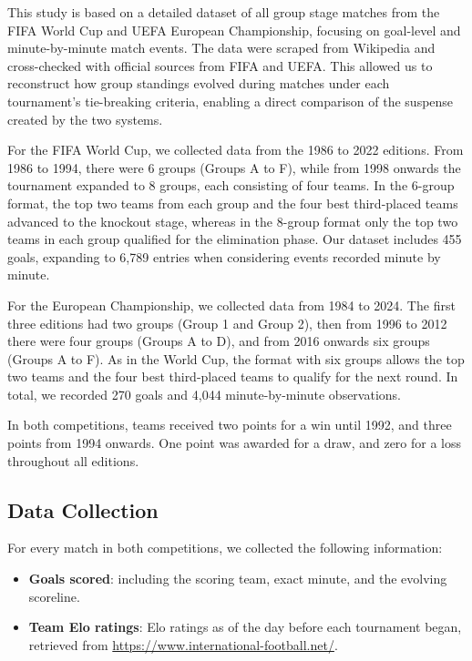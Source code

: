 \documentclass[11pt]{article}
\begin{document}
This study is based on a detailed dataset of all group stage matches from the FIFA World Cup and UEFA European Championship, focusing on goal-level and minute-by-minute match events. The data were scraped from Wikipedia and cross-checked with official sources from FIFA and UEFA. This allowed us to reconstruct how group standings evolved during matches under each tournament's tie-breaking criteria, enabling a direct comparison of the suspense created by the two systems.

For the FIFA World Cup, we collected data from the 1986 to 2022 editions. From 1986 to 1994, there were 6 groups (Groups A to F), while from 1998 onwards the tournament expanded to 8 groups, each consisting of four teams. In the 6-group format, the top two teams from each group and the four best third-placed teams advanced to the knockout stage, whereas in the 8-group format only the top two teams in each group qualified for the elimination phase. Our dataset includes 455 goals, expanding to 6,789 entries when considering events recorded minute by minute.

For the European Championship, we collected data from 1984 to 2024. The first three editions had two groups (Group 1 and Group 2), then from 1996 to 2012 there were four groups (Groups A to D), and from 2016 onwards six groups (Groups A to F). As in the World Cup, the format with six groups allows the top two teams and the four best third-placed teams to qualify for the next round. In total, we recorded 270 goals and 4,044 minute-by-minute observations.

In both competitions, teams received two points for a win until 1992, and three points from 1994 onwards. One point was awarded for a draw, and zero for a loss throughout all editions.


\subsection{Data Collection}

For every match in both competitions, we collected the following information:

\begin{itemize}
    \item \textbf{Goals scored}: including the scoring team, exact minute, and the evolving scoreline.
    \item \textbf{Team Elo ratings}: Elo ratings as of the day before each tournament began, retrieved from \url{https://www.international-football.net/}.
\end{itemize}
\end{document}

